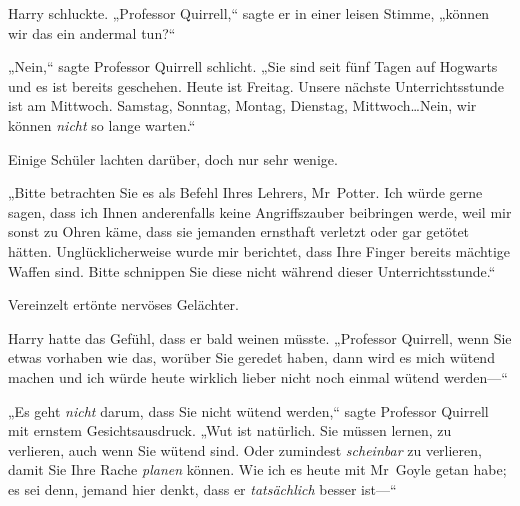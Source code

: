 Harry schluckte. „Professor Quirrell,“ sagte er in einer leisen Stimme, „können wir das ein andermal tun?“

„Nein,“ sagte Professor Quirrell schlicht. „Sie sind seit fünf Tagen auf Hogwarts und es ist bereits geschehen. Heute ist Freitag. Unsere nächste Unterrichtsstunde ist am Mittwoch. Samstag, Sonntag, Montag, Dienstag, Mittwoch…Nein, wir können \emph{nicht} so lange warten.“

Einige Schüler lachten darüber, doch nur sehr wenige.

„Bitte betrachten Sie es als Befehl Ihres Lehrers, Mr~Potter. Ich würde gerne sagen, dass ich Ihnen anderenfalls keine Angriffszauber beibringen werde, weil mir sonst zu Ohren käme, dass sie jemanden ernsthaft verletzt oder gar getötet hätten. Unglücklicherweise wurde mir berichtet, dass Ihre Finger bereits mächtige Waffen sind. Bitte schnippen Sie diese nicht während dieser Unterrichtsstunde.“

Vereinzelt ertönte nervöses Gelächter.

Harry hatte das Gefühl, dass er bald weinen müsste. „Professor Quirrell, wenn Sie etwas vorhaben wie das, worüber Sie geredet haben, dann wird es mich wütend machen und ich würde heute wirklich lieber nicht noch einmal wütend werden—“

„Es geht \emph{nicht} darum, dass Sie nicht wütend werden,“ sagte Professor Quirrell mit ernstem Gesichtsausdruck. „Wut ist natürlich. Sie müssen lernen, zu verlieren, auch wenn Sie wütend sind. Oder zumindest \emph{scheinbar} zu verlieren, damit Sie Ihre Rache \emph{planen} können. Wie ich es heute mit Mr~Goyle getan habe; es sei denn, jemand hier denkt, dass er \emph{tatsächlich} besser ist—“


